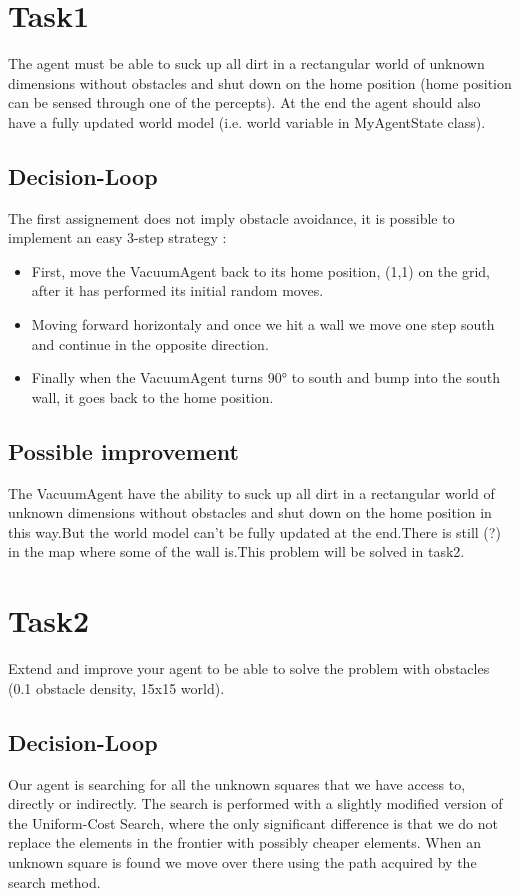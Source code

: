  \addtocounter{section}{0}
 \thispagestyle{empty}
\section{Task1}
The agent must be able to suck up all dirt in a rectangular world of unknown dimensions without obstacles and shut down on the home position (home position can be sensed through one of the percepts). At the end the agent should also have a fully updated world model (i.e. world variable in MyAgentState class). 

\subsection{Decision-Loop}
The first assignement does not imply obstacle avoidance, it is possible
to implement an easy 3-step strategy :

\begin{itemize}
  \item First, move the VacuumAgent back to its home position, (1,1) on the grid, after it has performed its initial random moves.
  \item Moving forward horizontaly and once we hit a wall we move one step south and continue in the opposite direction.
  \item Finally when the VacuumAgent turns 90° to south and bump into the south wall, it goes back to the home position.
\end{itemize}

\subsection{Possible improvement}

The VacuumAgent have the ability to suck up all dirt in a rectangular world of unknown dimensions without obstacles and shut down on the home position in this way.But the world model can't be fully updated at the end.There is still (?) in the map where some of the wall is.This problem will be solved in task2.

\section{Task2}
Extend and improve your agent to be able to solve the problem with obstacles (0.1 obstacle density, 15x15 world).

\subsection{Decision-Loop}
Our agent is searching for all the unknown squares that we have access to, directly or indirectly. The search is performed with a slightly modified version of the Uniform-Cost Search, where the only significant difference is that we do not replace the elements in the frontier with possibly cheaper elements. When an unknown square is found we move over there using the path acquired by the search method.

